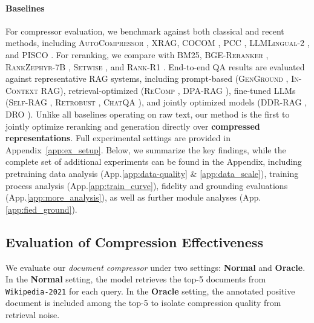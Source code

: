 \documentclass{applemlr}
\numberwithin{equation}{section}
\begin{document}
\paragraph{Baselines}
For compressor evaluation, we benchmark against both classical and recent methods, including 
\textsc{AutoCompressor} \citep{chevalier-etal-2023-adapting}, \textsc{XRAG}\citep{10.5555/3737916.3741392}, \textsc{COCOM} \citep{10.1145/3701551.3703527}, \textsc{PCC} \citep{dai-etal-2025-pretraining}, \textsc{LLMLingual-2} \citep{pan-etal-2024-llmlingua}, and \textsc{PISCO} \citep{louis-etal-2025-pisco}. 
For reranking, we compare with \textsc{BM25}, \textsc{BGE-Reranker} \citep{bge_m3}, \textsc{RankZephyr-7B} \citep{pradeep2023rankzephyreffectiverobustzeroshot}, \textsc{Setwise} \citep{10.1145/3626772.3657813}, and \textsc{Rank-R1} \citep{zhuang2025rankr1enhancingreasoningllmbased}. 
End-to-end QA results are evaluated against representative RAG systems, including 
prompt-based (\textsc{GenGround} \citep{shi-etal-2024-generate}, \textsc{In-Context RAG}), 
retrieval-optimized (\textsc{ReComp} \citep{xu2024recomp}, \textsc{DPA-RAG} \citep{dong2025understand}), 
fine-tuned LLMs (\textsc{Self-RAG} \citep{asai2024selfrag}, \textsc{Retrobust} \citep{yoran2024making}, \textsc{ChatQA} \citep{10.5555/3737916.3738409}), 
and jointly optimized models (\textsc{DDR-RAG} \citep{li2024rag}, \textsc{DRO} \citep{shi2025directretrievalaugmentedoptimizationsynergizing}).  
Unlike all baselines operating on raw text, our method is the first to jointly optimize reranking and generation directly over \textbf{compressed representations}.  
Full experimental settings are provided in Appendix~\ref{app:ex_setup}. Below, we summarize the key findings, while the complete set of additional experiments can be found in the Appendix, including pretraining data analysis (App.\ref{app:data-quality} \& \ref{app:data_scale}), training process analysis (App.\ref{app:train_curve}), fidelity and grounding evaluations (App.\ref{app:more_analysis}), as well as further module analyses  (App.\ref{app:fied_ground}).



\subsection{Evaluation of Compression Effectiveness}

We evaluate our \textit{document compressor} under two settings: \textbf{Normal} and \textbf{Oracle}.
In the \textbf{Normal} setting, the model retrieves the top-5 documents from \texttt{Wikipedia-2021} for each query.
In the \textbf{Oracle} setting, the annotated positive document is included among the top-5 to isolate compression quality from retrieval noise.
\end{document}
